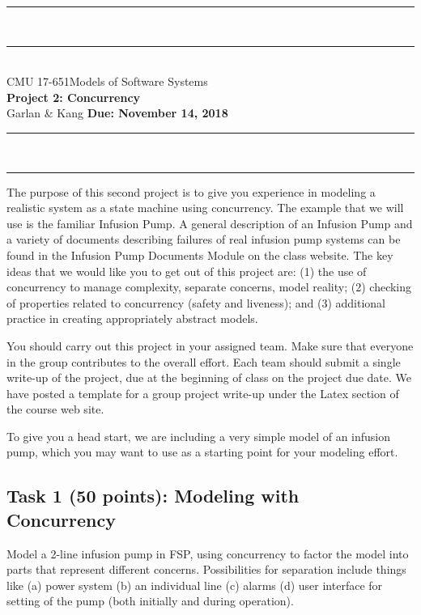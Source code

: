 \documentclass{article}
\newcommand{\head}{\subsection*}
\begin{document}
\begin{center}
\rule{\textwidth}{1.5pt} \\ \rule[10pt]{\textwidth}{1pt}\\
CMU 17-651\hfill Models of Software Systems\\[3ex]
{\Large\bf Project 2: Concurrency}\\[3ex]
Garlan \& Kang \hfill {\bf Due: November 14, 2018} \rule{\textwidth}{1pt}
\\\rule[9.5pt]{\textwidth}{1.5pt}
\end{center}

The purpose of this second project is to give you experience in
modeling a realistic system as a state machine using concurrency.
The example that we will use is the familiar Infusion Pump.
A general description of an Infusion Pump and a variety of documents describing 
failures of real infusion pump systems can be found in the
Infusion Pump Documents Module on the class website. The key
ideas that we would like you to get out of this project are: (1) the
use of concurrency to manage complexity, separate concerns, model
reality; (2) checking of properties related to concurrency (safety
and liveness); and (3) additional practice in creating appropriately
abstract models.

\bigskip You should carry out this project in your assigned team. Make sure that everyone in the
group contributes to the overall effort. Each team should submit a single write-up of the project,
due at the beginning of class on the project due date. We have posted a template for a group
project write-up under the Latex section of the course web site.

\bigskip To give you a head start, we are including a very simple model of an infusion pump, which you may want to use as a starting point for your modeling effort. 

\head{Task 1 (50 points): Modeling with Concurrency}

Model a 2-line infusion pump in FSP, using concurrency to factor the model into parts that
represent different concerns. Possibilities for separation include things like (a) power system (b) an individual line (c) alarms (d) user interface for setting of the pump (both initially and during operation).
\end{document}
